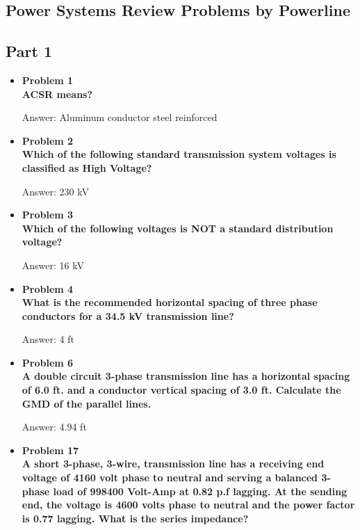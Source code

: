 \documentclass{article}
\begin{document}
\begin{center}

    
\section{Power Systems Review Problems by Powerline}
\subsection{Part 1}
\begin{itemize}

    \item\textbf{Problem 1}\\
    \textbf{ACSR means?}

    Answer: Aluminum conductor steel reinforced
    
    \item\textbf{Problem 2}\\
    \textbf{Which of the following standard transmission system voltages is classified as High Voltage?}

    Answer: 230 kV
    
    \item\textbf{Problem 3}\\
    \textbf{Which of the following voltages is NOT a standard distribution voltage?}

    Answer: 16 kV
    
    \item\textbf{Problem 4}\\
    \textbf{What is the recommended horizontal spacing of three phase conductors for a 34.5 kV transmission line?}

    Answer: 4 ft
    
    \item\textbf{Problem 6}\\
    \textbf{A double circuit 3-phase transmission line has a horizontal spacing of 6.0 ft. and a conductor vertical spacing of 3.0 ft. Calculate the GMD of the parallel lines.}

    Answer: 4.94 ft
    
    \item \textbf{Problem 17}\\
    \textbf{A short 3-phase, 3-wire, transmission line has a receiving end voltage of 4160 volt phase to neutral and serving a balanced 3-phase load of 998400 Volt-Amp at 0.82 p.f lagging. At the sending end, the voltage is 4600 volts phase to neutral and the power factor is 0.77 lagging. What is the series impedance?}


\end{itemize}
\end{center}
\end{document}
